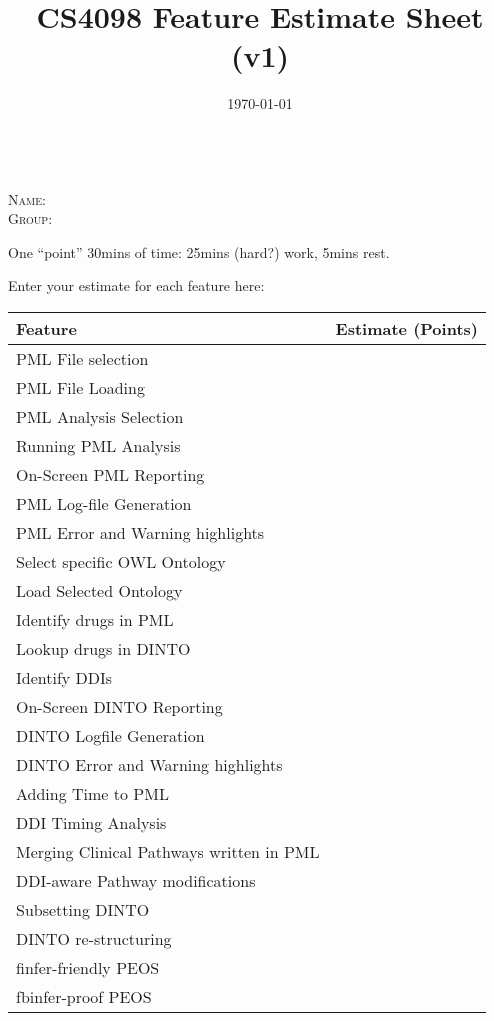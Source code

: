 \documentclass{amsart}
\title{CS4098 Feature  Estimate Sheet (v1)}
\author{}
\date\today                                        %
\begin{document}
\maketitle

~
\\
\textsc{Name:}
\\
\textsc{Group:}

\vspace{10pt}
One ``point''  30mins of time: 25mins (hard?) work, 5mins rest.

\vspace{10pt}
Enter your estimate for each feature here:

\begin{tabular}{|l|c|}
\hline
 Feature & Estimate (Points)
\\\hline
PML File selection &
\\\hline
PML File Loading &
\\\hline
PML Analysis Selection &
\\\hline
Running PML Analysis &
\\\hline
On-Screen PML Reporting &
\\\hline
PML Log-file Generation &
\\\hline
PML Error and Warning highlights &
\\\hline
Select specific OWL Ontology &
\\\hline
Load Selected Ontology &
\\\hline
Identify drugs in PML &
\\\hline
Lookup drugs in DINTO &
\\\hline
Identify DDIs &
\\\hline
On-Screen DINTO Reporting &
\\\hline
DINTO Logfile Generation &
\\\hline
DINTO Error and Warning highlights &
\\\hline
Adding Time to PML &
\\\hline
DDI Timing Analysis &
\\\hline
Merging Clinical Pathways written in PML &
\\\hline
DDI-aware Pathway modifications &
\\\hline
Subsetting DINTO &
\\\hline
DINTO re-structuring &
\\\hline
finfer-friendly PEOS  &
\\\hline
fbinfer-proof PEOS &
\\\hline
\end{tabular}
\end{document}

